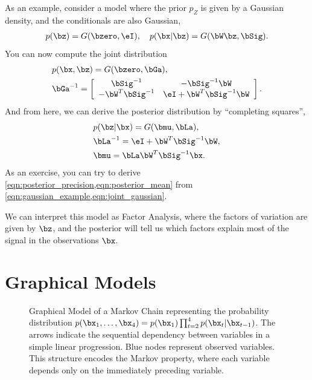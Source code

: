 \documentclass{lecture}
\begin{document}
As an example, consider a model where the prior $p_Z$ is given by a Gaussian density, and the conditionals are also Gaussian,
\begin{align}
	p(\bz) = G(\bzero,\eI),~~~p(\bx|\bz)=G(\bW\bz,\bSig). \label{eqn:gaussian_example}
\end{align}
You can now compute the joint distribution
\begin{align}
	 &p(\bx,\bz) = G(\bzero,\bGa),\\
	 &\bGa^{-1}=\left[\begin{array}{cc}
			                  \bSig^{-1}       & -\bSig^{-1}\bW           \\
			                  -\bW^T\bSig^{-1} & \eI + \bW^T\bSig^{-1}\bW
		                  \end{array}\right]. \label{eqn:joint_gaussian}
\end{align}
And from here, we can derive the posterior distribution by ``completing squares'',
\begin{align}
	 &p(\bz|\bx) = G(\bmu,\bLa),\\
	 &\bLa^{-1} = \eI + \bW^T\bSig^{-1}\bW, \label{eqn:posterior_precision}\\
	 &\bmu = \bLa \bW^T\bSig^{-1}\bx. \label{eqn:posterior_mean}
\end{align}
As an exercise, you can try to derive \cref{eqn:posterior_precision,eqn:posterior_mean} from \cref{eqn:gaussian_example,eqn:joint_gaussian}.

We can interpret this model as Factor Analysis, where the factors of variation are given by $\bz$, and the posterior will tell us which factors explain most of the signal in the observations $\bx$.


\section{Graphical Models}

\begin{figure}[ht]
	\centering
	\caption{Graphical Model of a Markov Chain representing the probability distribution $p(\bx_1,\ldots,\bx_4) = p(\bx_1)\prod_{t=2}^4 p(\bx_t|\bx_{t-1})$. The arrows indicate the sequential dependency between variables in a simple linear progression. Blue nodes represent observed variables. This structure encodes the Markov property, where each variable depends only on the immediately preceding variable.}
	\label{fig:markov_chain}
\end{figure}
\end{document}
